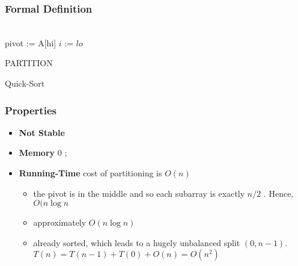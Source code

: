 								
\subsubsection{Formal Definition}

	\begin{algorithm}[H]
	\DontPrintSemicolon
	\SetAlgoLined{}
	\\
	pivot := A[hi]\;
	$i$ := $lo$\;
	\caption{PARTITION}
	\end{algorithm}

	\begin{algorithm}[H]
	\DontPrintSemicolon
	\SetAlgoLined{}
	\;
	\caption{Quick-Sort}
	\end{algorithm}
	
	\subsubsection{Properties}

	\begin{itemize}
			\item\textbf{Not Stable}
			\item\textbf{Memory} $0$ ;  
			\item\textbf{Running-Time} cost of partitioning is $O(n)$
					\begin{itemize}
							\item[] the pivot is in the middle and so
									each subarray is exactly $n/2$ . Hence, $O(n
									\log n$
							\item[] approximately $O(n \log n)$
							\item[] already sorted, which leads to a
									hugely unbalanced split $(0, n-1)$. $T(n) =
									T(n-1) + T(0) + O(n) = O(n^2)$
					\end{itemize}
	\end{itemize}

